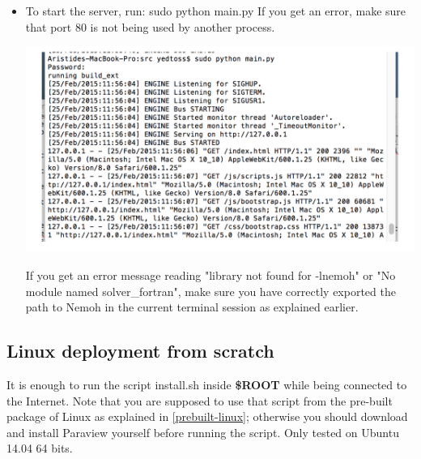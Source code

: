 \documentclass[12pt]{article}
\newcommand{\ROOT}{{\textbf{\$ROOT}}}
\begin{document}
\begin{itemize}
							
							\item
							To start the server, run:
								{\color{blue} sudo python main.py}
							If you get an error, make sure that port 80 is not being used by another process.
							
						\vspace{\abovedisplayskip}
						\begin{minipage}{\linewidth}
							\centering
							\includegraphics[scale=0.75]{img/19}
						\end{minipage}
						\vspace{\belowdisplayskip}
						
						If you get an error message reading "library not found for -lnemoh" or "No module named solver{\_}fortran", make sure you have correctly exported the path to Nemoh in the current terminal session as explained earlier.
						
					
					
					
					
					
					
				
	
	
\end{itemize}


\subsection{Linux deployment from scratch}

It is enough to run the script install.sh inside \ROOT{} while being connected to the Internet. Note that you are supposed to use that script from the pre-built package of Linux as explained in \ref{prebuilt-linux}; otherwise you should download and install Paraview yourself before running the script.
Only tested on Ubuntu 14.04 64 bits.
\end{document}
